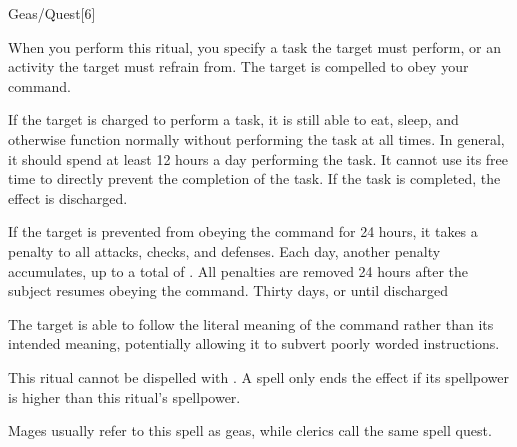 \begin{spellsection}{Geas/Quest}[6]
    \begin{spellheader}
    \end{spellheader}
    \begin{spellcontent}
        \begin{spelltargetinginfo}
            \spellrng{\rngmed}
        \end{spelltargetinginfo}
        \begin{spelleffects}
            \spelleffect When you perform this ritual, you specify a task the target must perform, or an activity the target must refrain from. The target is compelled to obey your command.

            If the target is charged to perform a task, it is still able to eat, sleep, and otherwise function normally without performing the task at all times. In general, it should spend at least 12 hours a day performing the task. It cannot use its free time to directly prevent the completion of the task. If the task is completed, the effect is discharged.

            \par If the target is prevented from obeying the command for 24 hours, it takes a  penalty to all attacks, checks, and defenses. Each day, another  penalty accumulates, up to a total of . All penalties are removed 24 hours after the subject resumes obeying the command.
            \spelldur Thirty days, or until discharged \dismissable
        \end{spelleffects}
    \end{spellcontent}
    \begin{spellfooter}
        \spellnotes The target is able to follow the literal meaning of the command rather than its intended meaning, potentially allowing it to subvert poorly worded instructions.

        \par This ritual cannot be dispelled with . A  spell only ends the effect if its spellpower is higher than this ritual's spellpower.

        \par Mages usually refer to this spell as geas, while clerics call the same spell quest.
    \end{spellfooter}
\end{spellsection}

